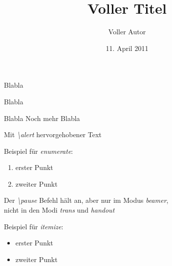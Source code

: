 \documentclass[handout]{beamer} %
\title[Kurztitel]{Voller Titel}
\author[Kurzautor]{Voller Autor}
\institute{Hochschule Niederhein - Fachbereich Elektrotechnik \& Informatik
}
\date{11. April 2011}
\begin{document}
\frame[plain]{\titlepage}


\begin{frame}{Blabla}


Blabla

\begin{block}{Blabla}
Noch mehr Blabla
\end{block}

\alert{Mit {\em \textbackslash alert} hervorgehobener Text}

\vspace{1ex}
Beispiel für {\em enumerate}:
\begin{enumerate}
\item erster Punkt
\item zweiter Punkt
\end{enumerate}

\vspace{1ex}
Der {\em \textbackslash pause} Befehl hält an, aber
nur im Modus {\em beamer},\\
nicht in den Modi {\em trans} und {\em handout}
\pause

\vspace{1ex}
Beispiel für {\em itemize}:
\begin{itemize}
\item erster Punkt
\item zweiter Punkt
\end{itemize}

\end{frame}
\end{document}
